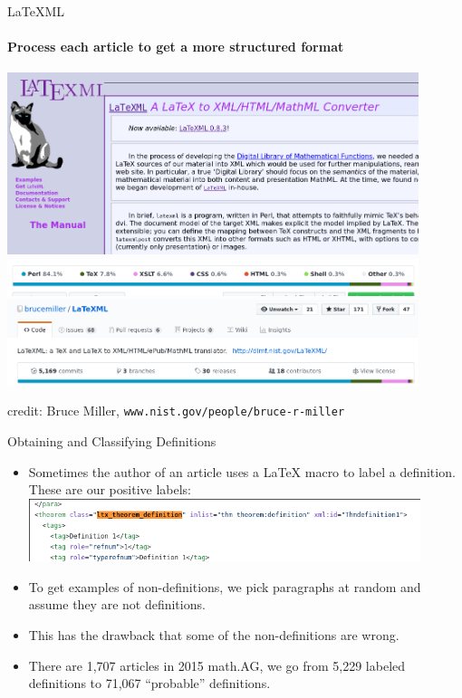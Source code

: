 \documentclass[10pt]{beamer}
\begin{document}
\begin{frame}{LaTeXML}
    \framesubtitle{Process each article to get a more structured format}
    \includegraphics[width=0.9\textwidth]{ltxml_website.png}
    \includegraphics[width=0.9\textwidth]{ltxml_github2.png}
    \includegraphics[width=0.9\textwidth]{ltxml_github1.png}
    \begin{flushright}
        {\tiny credit: Bruce Miller, \texttt{www.nist.gov/people/bruce-r-miller}}
    \end{flushright}
\end{frame}

\begin{frame}{Obtaining and Classifying Definitions}
    \begin{itemize}
        \item Sometimes the author of an article uses a \LaTeX{} macro to label a definition. These are our positive labels:
    \includegraphics[width=0.9\textwidth]{ltxml_defin_xml.png}
    \item To get examples of non-definitions, we pick paragraphs at random and assume they are not definitions.
        \item This has the drawback that some of the non-definitions are wrong.
    \item There are 1,707 articles in 2015 math.AG, we go from 5,229 labeled definitions to 71,067 ``probable'' definitions.  \end{itemize}
\end{frame}
\end{document}
